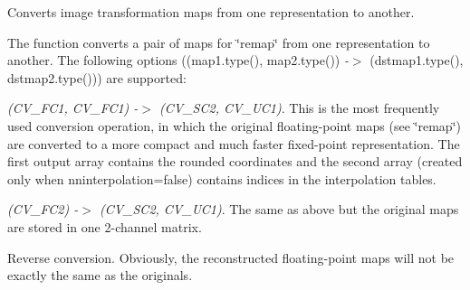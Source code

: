 Converts image transformation maps from one representation to another.

The function converts a pair of maps for \char`\"{}remap\char`\"{} from one representation to another. The following options ({\ttfamily (map1.\+type(), map2.\+type())} {\itshape -\/$>$} {\ttfamily (dstmap1.\+type(), dstmap2.\+type())}) are supported\+:


\begin{DoxyItemize}
\item {\itshape (C\+V\+\_\+F\+C1, C\+V\+\_\+F\+C1) -\/$>$ (C\+V\+\_\+S\+C2, C\+V\+\_\+U\+C1)}. This is the most frequently used conversion operation, in which the original floating-\/point maps (see \char`\"{}remap\char`\"{}) are converted to a more compact and much faster fixed-\/point representation. The first output array contains the rounded coordinates and the second array (created only when {\ttfamily nninterpolation=false}) contains indices in the interpolation tables. 
\item {\itshape (C\+V\+\_\+F\+C2) -\/$>$ (C\+V\+\_\+S\+C2, C\+V\+\_\+U\+C1)}. The same as above but the original maps are stored in one 2-\/channel matrix. 
\item Reverse conversion. Obviously, the reconstructed floating-\/point maps will not be exactly the same as the originals. 
\end{DoxyItemize}


